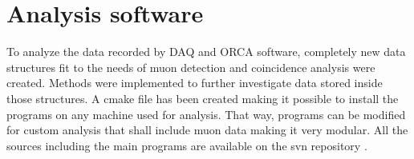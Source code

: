 
\chapter{Analysis software}
\label{ch:Analysis software}
  To analyze the data recorded by DAQ and ORCA software, completely new data structures fit to the needs of muon detection and coincidence analysis were created. 
  Methods were implemented to further investigate data stored inside those structures.
  A cmake file has been created making it possible to install the programs on any machine used for analysis. That way, programs can be modified for custom analysis that shall include muon data making it very modular. 
  All the sources including the main programs are available on the svn repository . 
  
